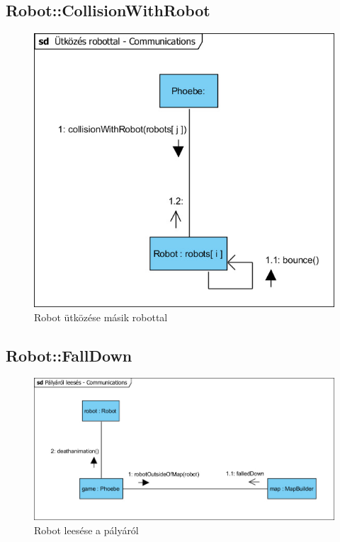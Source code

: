\subsection{Robot::CollisionWithRobot}
\begin{figure}[h]
\begin{center}
\includegraphics[width=17cm]{images/Commdiagrams/Comm_CollisionWithRobot.jpg}
\caption{Robot ütközése másik robottal}
\label{fig:example5}
\end{center}
\end{figure}
\pagebreak

\subsection{Robot::FallDown}
\begin{figure}[h]
\begin{center}
\includegraphics[width=17cm]{images/Commdiagrams/Comm_FallingDown.jpg}
\caption{Robot leesése a pályáról}
\label{fig:example6}
\end{center}
\end{figure}
\pagebreak

